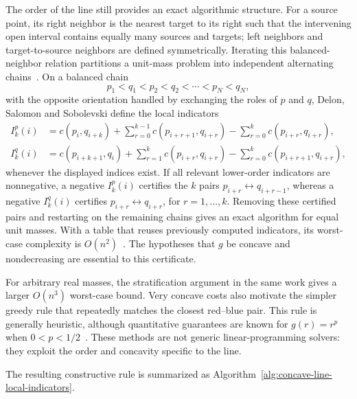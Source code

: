 The order of the line still provides an exact algorithmic structure. For a source point, its right neighbor is the nearest target to its right such that the intervening open interval contains equally many sources and targets; left neighbors and target-to-source neighbors are defined symmetrically. Iterating this balanced-neighbor relation partitions a unit-mass problem into independent alternating chains~\cite{delon-concave}. On a balanced chain
\[
	p_1<q_1<p_2<q_2<\cdots<p_N<q_N,
\]
with the opposite orientation handled by exchanging the roles of $p$ and $q$, Delon, Salomon and Sobolevski define the local indicators
\begin{align*}
	I_k^p(i)
	&=
	c(p_i,q_{i+k})
	+
	\sum_{r=0}^{k-1}c(p_{i+r+1},q_{i+r})
	-
	\sum_{r=0}^{k}c(p_{i+r},q_{i+r}),\\
	I_k^q(i)
	&=
	c(p_{i+k+1},q_i)
	+
	\sum_{r=1}^{k}c(p_{i+r},q_{i+r})
	-
	\sum_{r=0}^{k}c(p_{i+r+1},q_{i+r}),
\end{align*}
whenever the displayed indices exist. If all relevant lower-order indicators are nonnegative, a negative $I_k^p(i)$ certifies the $k$ pairs $p_{i+r}\leftrightarrow q_{i+r-1}$, whereas a negative $I_k^q(i)$ certifies $p_{i+r}\leftrightarrow q_{i+r}$, for $r=1,\ldots,k$. Removing these certified pairs and restarting on the remaining chains gives an exact algorithm for equal unit masses. With a table that reuses previously computed indicators, its worst-case complexity is $O(n^2)$~\cite{delon-concave}. The hypotheses that $g$ be concave and nondecreasing are essential to this certificate.

For arbitrary real masses, the stratification argument in the same work gives a larger $O(n^3)$ worst-case bound. Very concave costs also motivate the simpler greedy rule that repeatedly matches the closest red--blue pair. This rule is generally heuristic, although quantitative guarantees are known for $g(r)=r^p$ when $0<p<1/2$~\cite{OttoliniSteinerberger2023GreedyConcave}. These methods are not generic linear-programming solvers: they exploit the order and concavity specific to the line.

The resulting constructive rule is summarized as Algorithm~\ref{alg:concave-line-local-indicators}.

